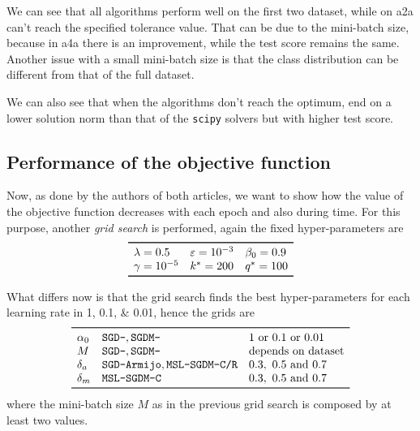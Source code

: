 We can see that all algorithms perform well on the first two dataset, while on a2a can't reach the specified tolerance value. That can be due to the mini-batch size, because in a4a there is an improvement, while the test score remains the same. Another issue with a small mini-batch size is that the class distribution can be different from that of the full dataset.

We can also see that when the algorithms don't reach the optimum, end on a lower solution norm than that of the \texttt{scipy} solvers but with higher test score.

\subsection{Performance of the objective function}

Now, as done by the authors of both articles, we want to show how the value of the objective function decreases with each epoch and also during time. For this purpose, another \emph{grid search} is performed, again the fixed hyper-parameters are
\[
\begin{array}{lll}
\toprule
\lambda=0.5 & \epsilon=\num{e-3} & \beta_0=0.9 \\
\gamma=\num{e-5} & k^\ast=200 & q^\ast=100 \\
\bottomrule
\end{array}
\]

What differs now is that the grid search finds the best hyper-parameters for each learning rate in \numlist{1; 0.1; 0.01}, hence the grids are
\[
\begin{array}{lll}
\toprule
\alpha_0 & \text{\texttt{SGD-}}, \text{\texttt{SGDM-}} & \text{\numlist[list-separator={ or },list-final-separator={ or }]{1;0.1;0.01}} \\
M & \text{\texttt{SGD-}}, \text{\texttt{SGDM-}} & \text{depends on dataset} \\
\delta_a & \text{\texttt{SGD-Armijo}}, \text{\texttt{MSL-SGDM-C/R}} & \numlist{0.3;0.5;0.7} \\
\delta_m & \text{\texttt{MSL-SGDM-C}} & \numlist{0.3; 0.5; 0.7} \\
\bottomrule
\end{array}
\]
where the mini-batch size $M$ as in the previous grid search is composed by at least two values.

